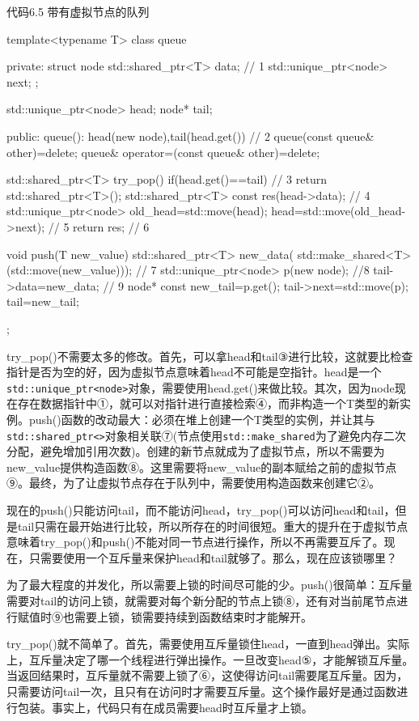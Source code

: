 代码6.5 带有虚拟节点的队列

\begin{cpp}
template<typename T>
class queue
{
private:
  struct node
  {
    std::shared_ptr<T> data;  // 1
    std::unique_ptr<node> next;
  };

  std::unique_ptr<node> head;
  node* tail;

public:
  queue():
    head(new node),tail(head.get())  // 2
  {}
  queue(const queue& other)=delete;
  queue& operator=(const queue& other)=delete;

  std::shared_ptr<T> try_pop()
  {
    if(head.get()==tail)  // 3
    {
      return std::shared_ptr<T>();
    }
    std::shared_ptr<T> const res(head->data);  // 4
    std::unique_ptr<node> old_head=std::move(head);
    head=std::move(old_head->next);  // 5
    return res;  // 6
  }

  void push(T new_value)
  {
    std::shared_ptr<T> new_data(
      std::make_shared<T>(std::move(new_value)));  // 7
    std::unique_ptr<node> p(new node);  //8
    tail->data=new_data;  // 9
    node* const new_tail=p.get();
    tail->next=std::move(p);
    tail=new_tail;
  }
};
\end{cpp}

try\_pop()不需要太多的修改。首先，可以拿head和tail③进行比较，这就要比检查指针是否为空的好，因为虚拟节点意味着head不可能是空指针。head是一个\texttt{std::unique\_ptr<node>}对象，需要使用head.get()来做比较。其次，因为node现在存在数据指针中①，就可以对指针进行直接检索④，而非构造一个T类型的新实例。push()函数的改动最大：必须在堆上创建一个T类型的实例，并让其与\texttt{std::shared\_ptr<>}对象相关联⑦(节点使用\texttt{std::make\_shared}为了避免内存二次分配，避免增加引用次数)。创建的新节点就成为了虚拟节点，所以不需要为new\_value提供构造函数⑧。这里需要将new\_value的副本赋给之前的虚拟节点⑨。最终，为了让虚拟节点存在于队列中，需要使用构造函数来创建它②。

现在的push()只能访问tail，而不能访问head，try\_pop()可以访问head和tail，但是tail只需在最开始进行比较，所以所存在的时间很短。重大的提升在于虚拟节点意味着try\_pop()和push()不能对同一节点进行操作，所以不再需要互斥了。现在，只需要使用一个互斥量来保护head和tail就够了。那么，现在应该锁哪里？

为了最大程度的并发化，所以需要上锁的时间尽可能的少。push()很简单：互斥量需要对tail的访问上锁，就需要对每个新分配的节点上锁⑧，还有对当前尾节点进行赋值时⑨也需要上锁，锁需要持续到函数结束时才能解开。

try\_pop()就不简单了。首先，需要使用互斥量锁住head，一直到head弹出。实际上，互斥量决定了哪一个线程进行弹出操作。一旦改变head⑤，才能解锁互斥量。当返回结果时，互斥量就不需要上锁了⑥，这使得访问tail需要尾互斥量。因为，只需要访问tail一次，且只有在访问时才需要互斥量。这个操作最好是通过函数进行包装。事实上，代码只有在成员需要head时互斥量才上锁。

